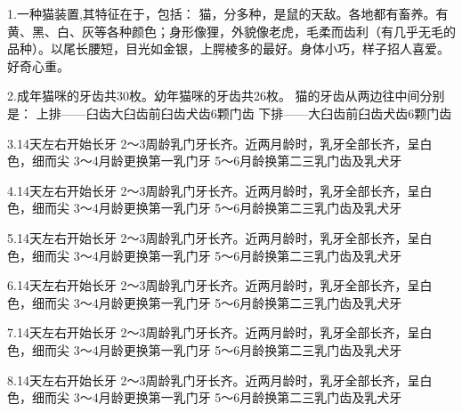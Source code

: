 \begin{large}
	1.一种猫装置,其特征在于，包括：
	猫，分多种，是鼠的天敌。各地都有畜养。有黄、黑、白、灰等各种颜色；身形像狸，外貌像老虎，毛柔而齿利（有几乎无毛的品种）。以尾长腰短，目光如金银，上腭棱多的最好。身体小巧，样子招人喜爱。好奇心重。
	
	2.成年猫咪的牙齿共30枚。幼年猫咪的牙齿共26枚。
	猫的牙齿从两边往中间分别是：
	上排——臼齿大臼齿前臼齿犬齿6颗门齿
	下排——大臼齿前臼齿犬齿6颗门齿
	
	3.14天左右开始长牙
	2～3周龄乳门牙长齐。近两月龄时，乳牙全部长齐，呈白色，细而尖
	3～4月龄更换第一乳门牙
	5～6月龄换第二三乳门齿及乳犬牙
	
	4.14天左右开始长牙
	2～3周龄乳门牙长齐。近两月龄时，乳牙全部长齐，呈白色，细而尖
	3～4月龄更换第一乳门牙
	5～6月龄换第二三乳门齿及乳犬牙
	
	5.14天左右开始长牙
	2～3周龄乳门牙长齐。近两月龄时，乳牙全部长齐，呈白色，细而尖
	3～4月龄更换第一乳门牙
	5～6月龄换第二三乳门齿及乳犬牙
	
	6.14天左右开始长牙
	2～3周龄乳门牙长齐。近两月龄时，乳牙全部长齐，呈白色，细而尖
	3～4月龄更换第一乳门牙
	5～6月龄换第二三乳门齿及乳犬牙
	
	7.14天左右开始长牙
	2～3周龄乳门牙长齐。近两月龄时，乳牙全部长齐，呈白色，细而尖
	3～4月龄更换第一乳门牙
	5～6月龄换第二三乳门齿及乳犬牙
	
	8.14天左右开始长牙
	2～3周龄乳门牙长齐。近两月龄时，乳牙全部长齐，呈白色，细而尖
	3～4月龄更换第一乳门牙
	5～6月龄换第二三乳门齿及乳犬牙	
	
\end{large}